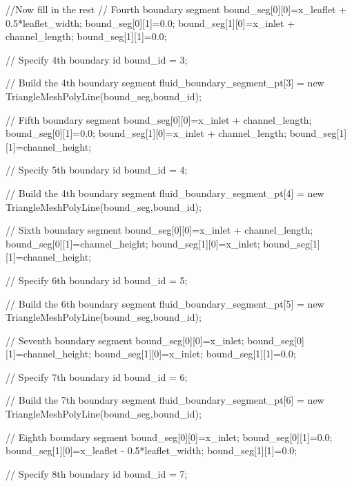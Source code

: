 \begin{DoxyCodeInclude}

 \textcolor{comment}{//Now fill in the rest }
 \textcolor{comment}{// Fourth boundary segment}
 bound\_seg[0][0]=x\_leaflet + 0.5*leaflet\_width;
 bound\_seg[0][1]=0.0;
 bound\_seg[1][0]=x\_inlet + channel\_length;
 bound\_seg[1][1]=0.0;
 
 \textcolor{comment}{// Specify 4th boundary id}
 bound\_id = 3;

 \textcolor{comment}{// Build the 4th boundary segment}
 fluid\_boundary\_segment\_pt[3] = \textcolor{keyword}{new} TriangleMeshPolyLine(bound\_seg,bound\_id);

 \textcolor{comment}{// Fifth boundary segment}
 bound\_seg[0][0]=x\_inlet + channel\_length;
 bound\_seg[0][1]=0.0;
 bound\_seg[1][0]=x\_inlet + channel\_length;
 bound\_seg[1][1]=channel\_height;
 
 \textcolor{comment}{// Specify 5th boundary id}
 bound\_id = 4;

 \textcolor{comment}{// Build the 4th boundary segment}
 fluid\_boundary\_segment\_pt[4] = \textcolor{keyword}{new} TriangleMeshPolyLine(bound\_seg,bound\_id);
 
 \textcolor{comment}{// Sixth boundary segment}
 bound\_seg[0][0]=x\_inlet + channel\_length;
 bound\_seg[0][1]=channel\_height;
 bound\_seg[1][0]=x\_inlet;
 bound\_seg[1][1]=channel\_height;
 
 \textcolor{comment}{// Specify 6th boundary id}
 bound\_id = 5;
 
 \textcolor{comment}{// Build the 6th boundary segment}
 fluid\_boundary\_segment\_pt[5] = \textcolor{keyword}{new} TriangleMeshPolyLine(bound\_seg,bound\_id);

 \textcolor{comment}{// Seventh boundary segment}
 bound\_seg[0][0]=x\_inlet;
 bound\_seg[0][1]=channel\_height;
 bound\_seg[1][0]=x\_inlet;
 bound\_seg[1][1]=0.0;
 
 \textcolor{comment}{// Specify 7th boundary id}
 bound\_id = 6;

 \textcolor{comment}{// Build the 7th boundary segment}
 fluid\_boundary\_segment\_pt[6] = \textcolor{keyword}{new} TriangleMeshPolyLine(bound\_seg,bound\_id);

 \textcolor{comment}{// Eighth boundary segment}
 bound\_seg[0][0]=x\_inlet;
 bound\_seg[0][1]=0.0;
 bound\_seg[1][0]=x\_leaflet - 0.5*leaflet\_width;
 bound\_seg[1][1]=0.0;
 
 \textcolor{comment}{// Specify 8th boundary id}
 bound\_id = 7;


\end{DoxyCodeInclude}

